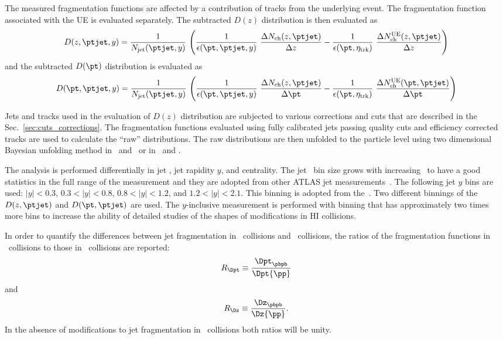 The measured fragmentation functions are affected by a contribution of tracks from the underlying event. The fragmentation function associated with the UE is evaluated separately. The subtracted $D(z)$ distribution is then evaluated as  
\begin{equation}
D(z,\ptjet,y) = \frac{1}{N_{\mathrm{jet}}(\ptjet,y)}  ~ 
\Bigg( 
\frac{1}{\epsilon(\pt ,\ptjet,y)} ~ \frac{\Delta N_{\mathrm{ch}}(z,\ptjet)}{\Delta z} - \frac{1}{\epsilon(\pt ,\eta_{\mathrm{trk}})} ~ \frac{\Delta N_{\mathrm{ch}}^{\mathrm{UE}}(z,\ptjet)}{\Delta z} 
\Bigg)
\end{equation}
and the subtracted $D(\pt)$ distribution is evaluated as
\begin{equation}
D(\pt,\ptjet,y) = \frac{1}{N_{\mathrm{jet}}(\ptjet,y)} ~ 
\Bigg( 
\frac{1}{\epsilon(\pt ,\ptjet,y)} ~ \frac{\Delta N_{\mathrm{ch}}(z,\ptjet)}{\Delta \pt} -  \frac{1}{\epsilon(\pt ,\eta_{\mathrm{trk}})} ~ \frac{\Delta N_{\mathrm{ch}}^{\mathrm{UE}}(\pt,\ptjet)}{\Delta \pt} 
\Bigg)
\end{equation}

Jets and tracks used in the evaluation of $D(z)$ distribution are subjected to various corrections and cuts that are described in the Sec.~\ref{sec:cuts_corrections}. The fragmentation functions evaluated using fully calibrated jets passing quality cuts and efficiency corrected tracks are used to calculate the ``raw'' distributions. The raw distributions are then unfolded to the particle level using two dimensional Bayesian unfolding method in \ptjet\ and \z\ or in \ptjet\ and \pttrk.

The analysis is performed differentially in jet \ptjet, jet rapidity $y$, and centrality.  The jet \ptjet\ bin size grows with increasing \ptjet\ to have a good statistics in the full range of the measurement and they are adopted from other ATLAS jet measurements~\cite{ATLAS276FFConf}. The following jet $y$ bins are used: $|y|<0.3$, $0.3<|y|<0.8$, $0.8<|y|<1.2$, and $1.2<|y|<2.1$. This binning is adopted from the~\cite{ATLAS276FFConf}. Two different binnings of the $D(z,\ptjet)$ and $D(\pt,\ptjet)$ are used. The $y$-inclusive measurement is performed with binning that has approximately two times more bins to increase the ability of detailed studies of the shapes of modifications in HI collisions.       

In order to quantify the differences between jet fragmentation in \pbpb\ collisions and \pp\ 
collisions, the ratios of the fragmentation functions in \pbpb\ collisions to those in \pp\ 
collisions are reported:
\begin{equation}
   R_{\Dpt} \equiv \frac{\Dpt_{\pbpb}}{\Dpt{\pp}}
\end{equation}
and
\begin{equation}
   R_{\Dz} \equiv \frac{\Dz_{\pbpb}}{\Dz{\pp}}.
\end{equation}
In the absence of modifications to jet fragmentation in \pbpb\ collisions both ratios will be unity.

